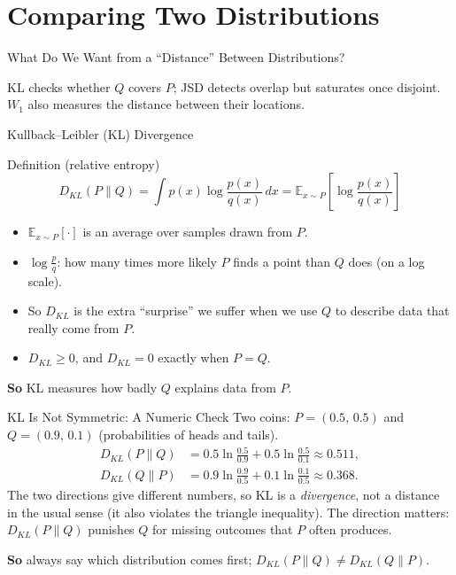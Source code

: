 \documentclass[10pt,aspectratio=169]{ntuabeamer}
\newcommand{\E}{\mathbb{E}}
\newcommand{\takeaway}[1]{\par\vspace{0.7em}\textcolor{ntuablue}{\textbf{So} #1}\par}
\begin{document}
	\section{Comparing Two Distributions}

	\begin{frame}{What Do We Want from a ``Distance'' Between Distributions?}
\small
\centering
{}
\par\raggedright
KL checks whether $Q$ covers $P$; JSD detects overlap but saturates once disjoint.
$W_1$ also measures the distance between their locations.
\end{frame}

	\begin{frame}{Kullback--Leibler (KL) Divergence}
		\small
		\begin{block}{Definition (relative entropy)}
			$$ D_{KL}(P \| Q) = \int p(x) \log \frac{p(x)}{q(x)}\, dx = \E_{x \sim P}\!\left[\log \frac{p(x)}{q(x)}\right] $$
		\end{block}
		\begin{itemize}
			\item $\E_{x\sim P}[\cdot]$ is an average over samples drawn from $P$.
			\item $\log\frac{p}{q}$: how many times more likely $P$ finds a point than $Q$ does (on a log scale).
			\item So $D_{KL}$ is the extra ``surprise'' we suffer when we use $Q$ to describe data that really come from $P$.
			\item $D_{KL}\ge 0$, and $D_{KL}=0$ exactly when $P=Q$.
		\end{itemize}
		\takeaway{KL measures how badly $Q$ explains data from $P$.}
	\end{frame}

	\begin{frame}{KL Is Not Symmetric: A Numeric Check}
		\small
		Two coins: $P=(0.5,\,0.5)$ and $Q=(0.9,\,0.1)$ (probabilities of heads and tails).
		\begin{align*}
			D_{KL}(P\|Q) &= 0.5\ln\tfrac{0.5}{0.9}+0.5\ln\tfrac{0.5}{0.1} \approx 0.511,\\
			D_{KL}(Q\|P) &= 0.9\ln\tfrac{0.9}{0.5}+0.1\ln\tfrac{0.1}{0.5} \approx 0.368.
		\end{align*}
		The two directions give different numbers, so KL is a \emph{divergence}, not a distance in the usual sense (it also violates the triangle inequality).
		The direction matters: $D_{KL}(P\|Q)$ punishes $Q$ for missing outcomes that $P$ often produces.

		\takeaway{always say which distribution comes first; $D_{KL}(P\|Q)\neq D_{KL}(Q\|P)$.}
	\end{frame}
\end{document}

